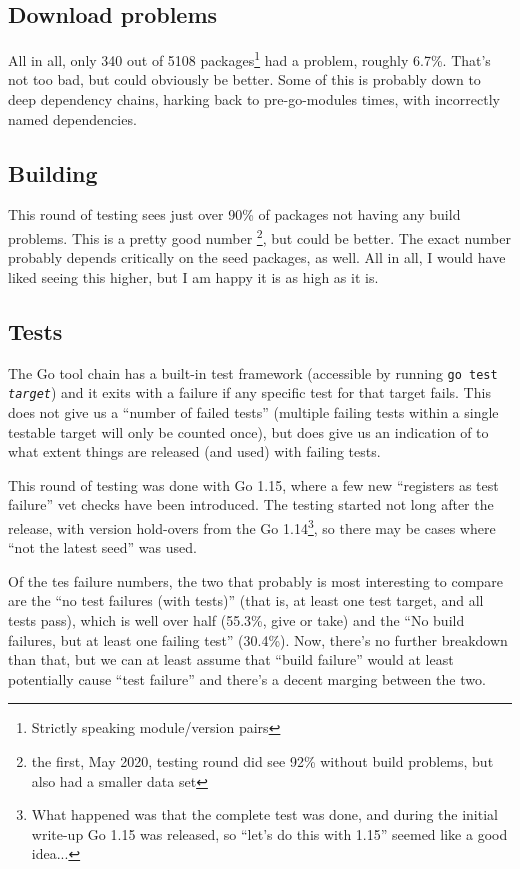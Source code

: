 \documentclass[a4paper]{paper}
\begin{document}


\subsection{Download problems}

All in all, only 340 out of 5108 packages\footnote{Strictly speaking
  module/version pairs} had a problem, roughly 6.7\%. That's not too
bad, but could obviously be better. Some of this is probably down to
deep dependency chains, harking back to pre-go-modules times, with
incorrectly named dependencies.

\subsection{Building}

This round of testing sees just over 90\% of packages not having any
build problems. This is a pretty good number \footnote{the first, May
  2020, testing round did see 92\% without build problems, but also
  had a smaller data set}, but could be better. The exact number
probably depends critically on the seed packages, as well. All in all,
I would have liked seeing this higher, but I am happy it is as high as
it is.


\subsection{Tests}

The Go tool chain has a built-in test framework (accessible by running
{\tt go test {\it target}}) and it exits with a failure if any
specific test for that target fails. This does not give us a ``number
of failed tests'' (multiple failing tests within a single testable
target will only be counted once), but does give us an indication of
to what extent things are released (and used) with failing tests.

This round of testing was done with Go 1.15, where a few new
``registers as test failure'' vet checks have been introduced. The
testing started not long after the release, with version hold-overs
from the Go 1.14\footnote{What happened was that the complete test was
  done, and during the initial write-up Go 1.15 was released, so
  ``let's do this with 1.15'' seemed like a good idea...}, so there
may be cases where ``not the latest seed'' was used.

Of the tes failure numbers, the two that probably is most interesting
to compare are the ``no test failures (with tests)'' (that is, at
least one test target, and all tests pass), which is well over half
(55.3\%, give or take) and the ``No build failures, but at least one
failing test'' (30.4\%). Now, there's no further breakdown than that,
but we can at least assume that ``build failure'' would at least
potentially cause ``test failure'' and there's a decent marging
between the two.
\end{document}
